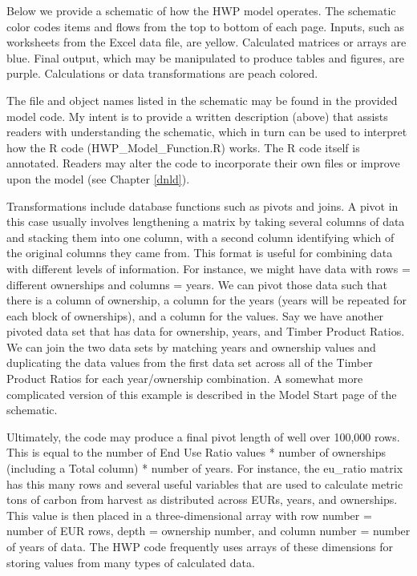 \documentclass[
  openany]{book}
\begin{document}
Below we provide a schematic of how the HWP model operates. The schematic color codes items and flows from the top to bottom of each page. Inputs, such as worksheets from the Excel data file, are yellow. Calculated matrices or arrays are blue. Final output, which may be manipulated to produce tables and figures, are purple. Calculations or data transformations are peach colored.

The file and object names listed in the schematic may be found in the provided model code. My intent is to provide a written description (above) that assists readers with understanding the schematic, which in turn can be used to interpret how the R code (HWP\_Model\_Function.R) works. The R code itself is annotated. Readers may alter the code to incorporate their own files or improve upon the model (see Chapter \ref{dnld}).

Transformations include database functions such as pivots and joins. A pivot in this case usually involves lengthening a matrix by taking several columns of data and stacking them into one column, with a second column identifying which of the original columns they came from. This format is useful for combining data with different levels of information. For instance, we might have data with rows = different ownerships and columns = years. We can pivot those data such that there is a column of ownership, a column for the years (years will be repeated for each block of ownerships), and a column for the values. Say we have another pivoted data set that has data for ownership, years, and Timber Product Ratios. We can join the two data sets by matching years and ownership values and duplicating the data values from the first data set across all of the Timber Product Ratios for each year/ownership combination. A somewhat more complicated version of this example is described in the Model Start page of the schematic.

Ultimately, the code may produce a final pivot length of well over 100,000 rows. This is equal to the number of End Use Ratio values * number of ownerships (including a Total column) * number of years. For instance, the eu\_ratio matrix has this many rows and several useful variables that are used to calculate metric tons of carbon from harvest as distributed across EURs, years, and ownerships. This value is then placed in a three-dimensional array with row number = number of EUR rows, depth = ownership number, and column number = number of years of data. The HWP code frequently uses arrays of these dimensions for storing values from many types of calculated data.
\end{document}
